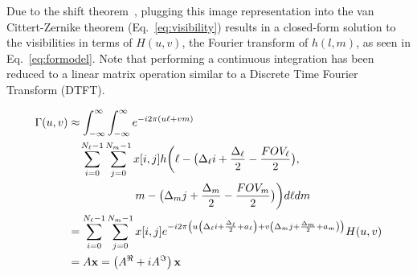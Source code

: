 {%
 
 Due to the shift theorem~\cite{oppenheim1997signals}, plugging this image representation into the van Cittert-Zernike theorem (Eq.~\ref{eq:visibility}) results in a closed-form solution to the visibilities in terms of $H(u,v)$, the Fourier transform of $h(l,m)$, as seen in Eq.~\ref{eq:formodel}. Note that performing a continuous integration has been reduced to a linear matrix operation similar to a Discrete Time Fourier Transform (DTFT). 

\begin{align}
		 \Gamma(u,v) &\approx \int_{- \infty}^{\infty}\int_{- \infty}^{\infty} {e^{-i 2 \pi  (u\ell + vm) }} 
		 \nonumber \\ & \quad \sum_{i=0}^{N_\ell-1}\sum_{j=0}^{N_m-1} x[i,j] 
		h \biggl(\ell- \bigl( \Delta_{\ell}i + \frac{\Delta_{\ell}}{2}  -\frac{FOV_\ell}{2} \bigr), \nonumber\\ 
		&  \qquad \qquad \qquad m- \bigl( \Delta_mj + \frac{\Delta_m}{2} -\frac{FOV_m}{2} \bigr) \biggl)  d\ell dm  
		\nonumber\\ &=  \sum_{i=0}^{N_\ell-1}{\sum_{j=0}^{N_m-1}  x[i,j] e^{-i 2 \pi \left(u  \left( \Delta_{\ell}i + \frac{\Delta_{\ell}}{2} + a_\ell \right) + v \left( \Delta_mj + \frac{\Delta_m}{2} + a_m \right)  \right)} H(u, v)} \nonumber\\ & = A {\bf x} = \left( A^{\Re} + i A^{\Im} \right) {\bf x}
		\label{eq:formodel}
		\end{align}

}
